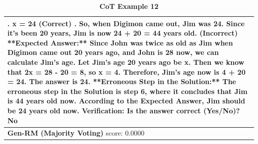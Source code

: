 \begin{table}[t]
\begin{tabular}{ |p{16.4cm}| }
{\newline
5. x = 24 {\color{red}(Correct)}\newline
\newline
6. So, when Digimon came out, Jim was 24. Since it's been 20 years, Jim is now 24 + 20 = 44 years old. {\color{blue}(Incorrect)}\newline
\newline
**Expected Answer:**\newline
\newline
Since John was twice as old as Jim when Digimon came out 20 years ago, and John is 28 now, we can calculate Jim's age. Let Jim's age 20 years ago be x. {\color{blue}Then we know that 2x = 28 - 20 = 8, so x = 4.} Therefore, Jim's age now is 4 + 20 = 24. The answer is 24.\newline
\newline
**Erroneous Step in the Solution:**\newline
\newline
The erroneous step in the Solution is step 6, where it concludes that Jim is 44 years old now. According to the Expected Answer, Jim should be 24 years old now.\newline
\newline
Verification: {\color{blue}Is the answer correct (Yes/No)? No}
\newline
} \\
\midrule
{\textbf{Gen-RM (Majority Voting)} score: {\color{blue}0.0000}}\newline \\
\midrule
\end{tabular}
\caption{
\textbf{{\genV} CoT Example 12} }
\label{cot-verifier-example-12-full-text}
\end{table}



